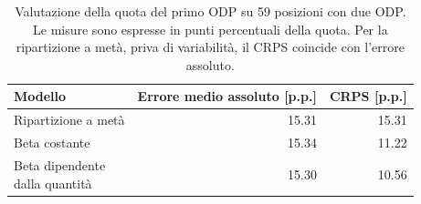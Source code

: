 \begin{table}[htbp]
\centering
\small
\begin{tabular}{@{}lrr@{}}
\toprule
\textbf{Modello} & \textbf{Errore medio assoluto [p.p.]} & \textbf{CRPS [p.p.]}\\
\midrule
Ripartizione a metà & \num{15.31} & \num{15.31}\\
Beta costante & \num{15.34} & \num{11.22}\\
\shortstack[l]{Beta dipendente\\dalla quantità} & \num{15.30} & \num{10.56}\\
\bottomrule
\end{tabular}
\caption{Valutazione della quota del primo ODP su 59 posizioni con due ODP. Le misure sono espresse in punti percentuali della quota. Per la ripartizione a metà, priva di variabilità, il CRPS coincide con l'errore assoluto.}
\label{tab:odp-split-comparison}
\end{table}
